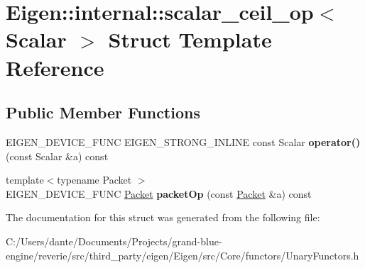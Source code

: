 \hypertarget{struct_eigen_1_1internal_1_1scalar__ceil__op}{}\section{Eigen\+::internal\+::scalar\+\_\+ceil\+\_\+op$<$ Scalar $>$ Struct Template Reference}
\label{struct_eigen_1_1internal_1_1scalar__ceil__op}
\subsection*{Public Member Functions}
\begin{DoxyCompactItemize}
\item 
\mbox{\label{struct_eigen_1_1internal_1_1scalar__ceil__op_aecc581d9ed66e5c93a9d00d7f14ea4fe}} 
E\+I\+G\+E\+N\+\_\+\+D\+E\+V\+I\+C\+E\+\_\+\+F\+U\+NC E\+I\+G\+E\+N\+\_\+\+S\+T\+R\+O\+N\+G\+\_\+\+I\+N\+L\+I\+NE const Scalar {\bfseries operator()} (const Scalar \&a) const
\item 
\mbox{\label{struct_eigen_1_1internal_1_1scalar__ceil__op_a7f40ce852d03a7ccc0fa510093af208c}} 
{\footnotesize template$<$typename Packet $>$ }\\E\+I\+G\+E\+N\+\_\+\+D\+E\+V\+I\+C\+E\+\_\+\+F\+U\+NC \mbox{\hyperlink{union_eigen_1_1internal_1_1_packet}{Packet}} {\bfseries packet\+Op} (const \mbox{\hyperlink{union_eigen_1_1internal_1_1_packet}{Packet}} \&a) const
\end{DoxyCompactItemize}


The documentation for this struct was generated from the following file\+:\begin{DoxyCompactItemize}
\item 
C\+:/\+Users/dante/\+Documents/\+Projects/grand-\/blue-\/engine/reverie/src/third\+\_\+party/eigen/\+Eigen/src/\+Core/functors/Unary\+Functors.\+h\end{DoxyCompactItemize}
